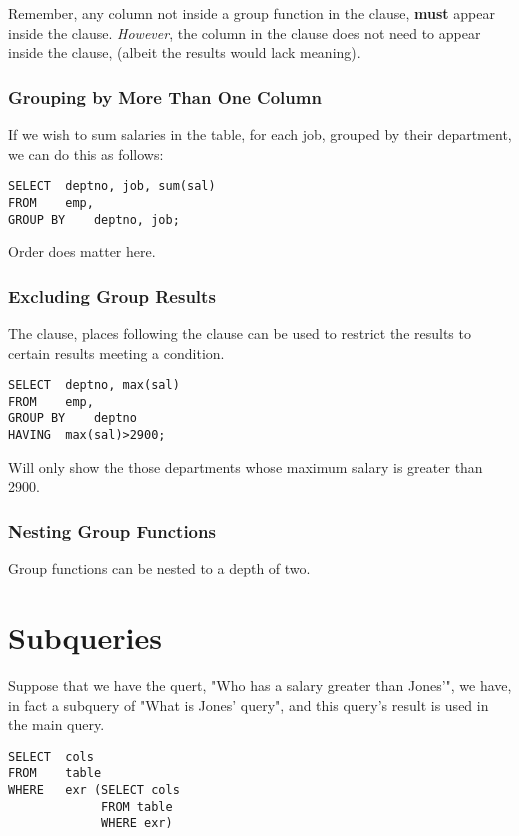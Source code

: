\documentclass[11pt,a4paper,twocolumn]{book}
\begin{document}
Remember, any column not inside a group function in the  clause, \textbf{must} appear inside the  clause. \textit{However}, the column in the  clause does not need to appear inside the  clause, (albeit the results would lack meaning).

\subsubsection{Grouping by More Than One Column}

If we wish to sum salaries in the  table, for each job, grouped by their department, we can do this as follows:

\begin{lstlisting}
SELECT	deptno, job, sum(sal)
FROM	emp,
GROUP BY	deptno, job;
\end{lstlisting}

Order does matter here.

\subsubsection{Excluding Group Results}

The  clause, places following the  clause can be used to restrict the results to certain results meeting a condition.

\begin{lstlisting}
SELECT	deptno, max(sal)
FROM	emp,
GROUP BY	deptno
HAVING	max(sal)>2900;
\end{lstlisting}

Will only show the those departments whose maximum salary is greater than 2900.

\subsubsection{Nesting Group Functions}

Group functions can be nested to a depth of two.

\section{Subqueries}

Suppose that we have the quert, "Who has a salary greater than Jones'", we have, in fact a subquery of "What is Jones' query", and this query's result is used in the main query.

\begin{lstlisting}
SELECT	cols
FROM	table
WHERE	exr (SELECT cols
			 FROM table
			 WHERE exr)
\end{lstlisting}
\end{document}
